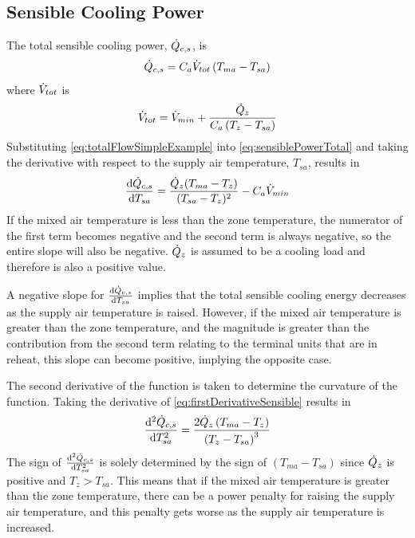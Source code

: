 \subsection{Sensible Cooling Power}

\newcommand{\totalFlow}{\flow{min} + \frac{\heatenergy{z}}{C_{a}\left(T_{z}-T_{sa}\right)}}
The total sensible cooling power, \(\dot{Q}_{c,s}\), is
\begin{equation}\label{eq:sensiblePowerTotal}
    \dot{Q}_{c,s} =  C_{a} \dot{V}_{tot} \left(T_{ma}-T_{sa}\right)
\end{equation}
where \(\dot{V}_{tot}\) is 
\begin{equation}\label{eq:totalFlowSimpleExample}
    \flow{tot} = \totalFlow{}
\end{equation}
Substituting  \ref{eq:totalFlowSimpleExample} into
\ref{eq:sensiblePowerTotal} and taking the derivative with respect to
the supply air temperature, \(T_{sa}\), results in
\begin{equation}\label{eq:firstDerivativeSensible}
    \dv{\dot{Q}_{c,s}}{T_{sa}} = \frac{\dot{Q}_{z} (T_{ma}-T_{z})}{(T_{sa}-T_{z})^2}-C_{a} \dot{V}_{min}
\end{equation}
If the mixed air temperature is less than the zone temperature, the
numerator of the first term becomes negative and the second term is
always negative, so the entire slope will also be negative.
\(\dot{Q}_{z}\) is assumed to be a cooling load and therefore is also
a positive value. 

A negative slope for \(\dv{\dot{Q}_{c,s}}{T_{sa}}\) implies that the
total sensible cooling energy decreases as the supply air temperature is
raised. However, if the mixed air temperature is greater than the zone
temperature, and the magnitude is greater than the contribution from
the second term relating to the terminal units that are in reheat,
this slope can become positive, implying the opposite case. 

The second derivative of the function is taken to determine the
curvature of the function. Taking the derivative of 
\ref{eq:firstDerivativeSensible} results in
\begin{equation}
    \dv[2]{\dot{Q}_{c,s}}{T_{sa}} = \frac{2 \dot{Q}_{z} \left(T_{ma}-T_z\right)}{\left(T_z-T_{sa}\right)^3}
\end{equation}
The sign of \(\dv[2]{\dot{Q}_{c,s}}{T_{sa}}\) is solely determined by
the sign of \((T_{ma} - T_{sa})\) since \(\dot{Q}_{z}\) is positive
and \(T_z > T_{sa} \). This means that if the mixed air temperature is
greater than the zone temperature, there can be a power penalty for
raising the supply air temperature, and this penalty gets worse as the
supply air temperature is increased. 



